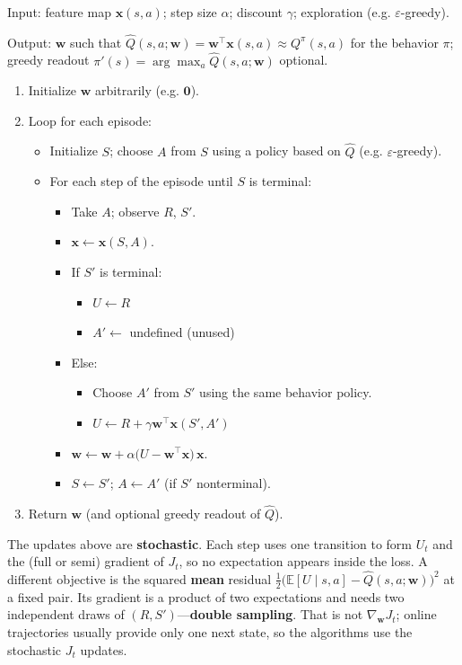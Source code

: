 \begin{implnote}
Input: feature map $\mathbf{x}(s,a)$; step size $\alpha$; discount $\gamma$; exploration (e.g. $\varepsilon$-greedy).

Output: $\mathbf{w}$ such that $\hat{Q}(s,a;\mathbf{w})=\mathbf{w}^\top\mathbf{x}(s,a)\approx Q^\pi(s,a)$ for the behavior $\pi$; greedy readout $\pi'(s)=\arg\max_a\hat{Q}(s,a;\mathbf{w})$ optional.

\begin{enumerate}
\item Initialize $\mathbf{w}$ arbitrarily (e.g. $\mathbf{0}$).
\item Loop for each episode:
\begin{itemize}
\item Initialize $S$; choose $A$ from $S$ using a policy based on $\hat{Q}$ (e.g. $\varepsilon$-greedy).
\item For each step of the episode until $S$ is terminal:
\begin{itemize}
\item Take $A$; observe $R$, $S'$.
\item $\mathbf{x}\leftarrow\mathbf{x}(S,A)$.
\item If $S'$ is terminal:
\begin{itemize}
\item $U\leftarrow R$
\item $A'\leftarrow$ undefined (unused)
\end{itemize}
\item Else:
\begin{itemize}
\item Choose $A'$ from $S'$ using the same behavior policy.
\item $U\leftarrow R+\gamma\mathbf{w}^\top\mathbf{x}(S',A')$
\end{itemize}
\item $\mathbf{w}\leftarrow\mathbf{w}+\alpha\bigl(U-\mathbf{w}^\top\mathbf{x}\bigr)\,\mathbf{x}$.
\item $S\leftarrow S'$; $A\leftarrow A'$ (if $S'$ nonterminal).
\end{itemize}
\end{itemize}
\item Return $\mathbf{w}$ (and optional greedy readout of $\hat{Q}$).
\end{enumerate}

\end{implnote}

The updates above are \textbf{stochastic}. Each step uses one transition to form $U_t$ and the (full or semi) gradient of $J_t$, so no expectation appears inside the loss. A different objective is the squared \textbf{mean} residual $\tfrac12\bigl(\mathbb{E}[U\mid s,a]-\hat{Q}(s,a;\mathbf{w})\bigr)^2$ at a fixed pair. Its gradient is a product of two expectations and needs two independent draws of $(R,S')$---\textbf{double sampling}. That is not $\nabla_{\mathbf{w}} J_t$; online trajectories usually provide only one next state, so the algorithms use the stochastic $J_t$ updates.

